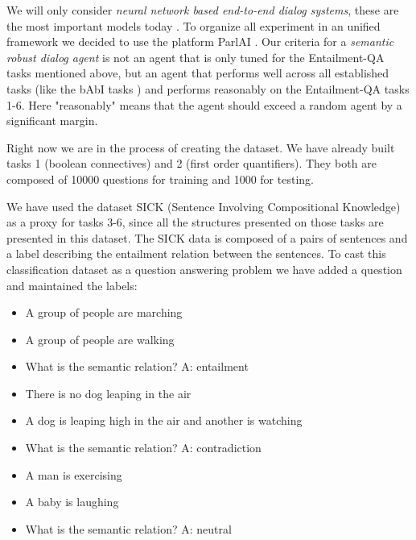 We will only consider \textit{neural network based end-to-end dialog systems}, these are the most important models today \cite{BordesW16, Lowe:2016, Serban:2016c, Serban:2016a, Shao:2017, Wen}. To organize all experiment in an unified framework we decided to use the platform ParlAI \cite{MillerFFLBBPW17}. Our criteria for a \textit{semantic robust dialog agent} is not an agent that is only tuned for the Entailment-QA tasks mentioned above, but an agent that performs well across all established tasks (like the bAbI tasks \cite{WestonBCM15}) and performs reasonably on the Entailment-QA tasks 1-6. Here "reasonably" means that the agent should exceed a random agent by a significant margin.

Right now we are in the process of creating the dataset. We have already built tasks 1 (boolean connectives) and 2 (first order quantifiers). They both are composed of 10000 questions for training and 1000 for testing.

We have used the dataset SICK (Sentence Involving Compositional Knowledge) \cite{Marelli14} as a proxy for tasks 3-6, since all the structures presented on those tasks are presented in this dataset. The SICK data is composed of a pairs of sentences and a label describing the entailment relation between the sentences. To cast this classification dataset as a question answering problem we have added a question and maintained the labels: 

\begin{itemize} 
\item[] A group of people are marching
\item[] A group of people are walking
\item[] What is the semantic relation? A: entailment
\end{itemize}

\begin{itemize} 
\item[] There is no dog leaping in the air
\item[] A dog is leaping high in the air and another is watching
\item[] What is the semantic relation? A: contradiction
\end{itemize}

\begin{itemize} 
\item[] A man is exercising
\item[] A baby is laughing
\item[] What is the semantic relation? A: neutral
\end{itemize}

